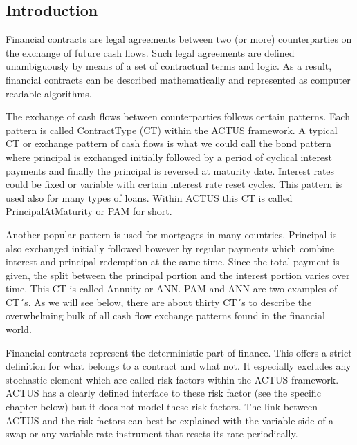 \documentclass[9pt,oneside]{amsart}
\begin{document}

\newpage



\tableofcontents



\newpage


\setlength{\columnsep}{20pt}
\begin{multicols}{2}



\section{Introduction}\label{sec:intro}

Financial contracts are legal agreements between two (or more) counterparties on the exchange of future cash flows. Such legal agreements are defined unambiguously by means of a set of contractual terms and logic. As a result, financial contracts can be described mathematically and represented as computer readable algorithms.

The exchange of cash flows between counterparties follows certain patterns. Each pattern is called ContractType (CT) within the ACTUS framework. A typical CT or exchange pattern of cash flows is what we could call the bond pattern where principal is exchanged initially followed by a period of cyclical interest payments and finally the principal is reversed at maturity date. Interest rates could be fixed or variable with certain interest rate reset cycles. This pattern is used also for many types of loans. Within ACTUS this CT is called PrincipalAtMaturity or PAM for short.

Another popular pattern is used for mortgages in many countries. Principal is also exchanged initially followed however by regular payments which combine interest and principal redemption at the same time. Since the total payment is given, the split between the principal portion and the interest portion varies over time. This CT is called Annuity or ANN. PAM and ANN are two examples of CT´s. As we will see below, there are about thirty CT´s to describe the overwhelming bulk of all cash flow exchange patterns found in the financial world.

Financial contracts represent the deterministic part of finance. This offers a strict definition for what belongs to a contract and what not. It especially excludes any stochastic element which are called risk factors within the ACTUS framework. ACTUS has a clearly defined interface to these risk factor (see the specific chapter below) but it does not model these risk factors. The link between ACTUS and the risk factors can best be explained with the variable side of a swap or any variable rate instrument that resets its rate periodically.


\end{multicols}
\end{document}
